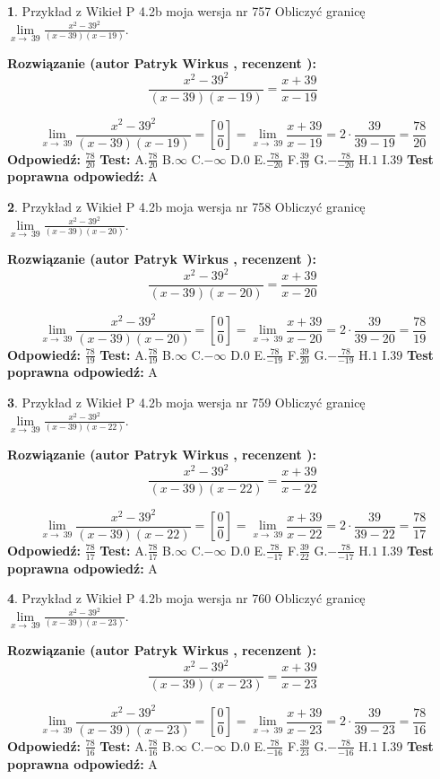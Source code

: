 \documentclass[12pt, a4paper]{article}
\theoremstyle{definition} %
\newtheorem{zad}{}
\newcommand{\zadStart}[1]{\begin{zad}#1\newline}
\newcommand{\zadStop}{\end{zad}}
\newcommand{\rozwStart}[2]{\noindent \textbf{Rozwiązanie (autor #1 , recenzent #2): }\newline}
\newcommand{\rozwStop}{\newline}
\newcommand{\odpStart}{\noindent \textbf{Odpowiedź:}\newline}
\newcommand{\odpStop}{\newline}
\newcommand{\testStart}{\noindent \textbf{Test:}\newline}
\newcommand{\testStop}{\newline}
\newcommand{\kluczStart}{\noindent \textbf{Test poprawna odpowiedź:}\newline}
\newcommand{\kluczStop}{\newline}
\begin{document}
\zadStart{Przykład z Wikieł P 4.2b moja wersja nr 757}
Obliczyć granicę $\lim\limits_{x\to\ 39}\frac{x^{2}-39^{2}}{(x-39)(x-19)}$.
\zadStop
\rozwStart{Patryk Wirkus}{}
$$\frac{x^{2}-39^{2}}{(x-39)(x-19)}=\frac{x+39}{x-19}$$

$$\lim\limits_{x\to\ 39}\frac{x^{2}-39^{2}}{(x-39)(x-19)}=[\frac{0}{0}]=\lim\limits_{x\to\ 39}\frac{x+39}{x-19}=2 \cdot \frac{39}{39-19} = \frac{78}{20}$$
\rozwStop
\odpStart
$\frac{78}{20}$
\odpStop
\testStart
A.$\frac{78}{20}$
B.$\infty$
C.$-\infty$
D.$0$
E.$\frac{78}{-20}$
F.$\frac{39}{19}$
G.$-\frac{78}{-20}$
H.$1$
I.$39$
\testStop
\kluczStart
A
\kluczStop



\zadStart{Przykład z Wikieł P 4.2b moja wersja nr 758}
Obliczyć granicę $\lim\limits_{x\to\ 39}\frac{x^{2}-39^{2}}{(x-39)(x-20)}$.
\zadStop
\rozwStart{Patryk Wirkus}{}
$$\frac{x^{2}-39^{2}}{(x-39)(x-20)}=\frac{x+39}{x-20}$$

$$\lim\limits_{x\to\ 39}\frac{x^{2}-39^{2}}{(x-39)(x-20)}=[\frac{0}{0}]=\lim\limits_{x\to\ 39}\frac{x+39}{x-20}=2 \cdot \frac{39}{39-20} = \frac{78}{19}$$
\rozwStop
\odpStart
$\frac{78}{19}$
\odpStop
\testStart
A.$\frac{78}{19}$
B.$\infty$
C.$-\infty$
D.$0$
E.$\frac{78}{-19}$
F.$\frac{39}{20}$
G.$-\frac{78}{-19}$
H.$1$
I.$39$
\testStop
\kluczStart
A
\kluczStop



\zadStart{Przykład z Wikieł P 4.2b moja wersja nr 759}
Obliczyć granicę $\lim\limits_{x\to\ 39}\frac{x^{2}-39^{2}}{(x-39)(x-22)}$.
\zadStop
\rozwStart{Patryk Wirkus}{}
$$\frac{x^{2}-39^{2}}{(x-39)(x-22)}=\frac{x+39}{x-22}$$

$$\lim\limits_{x\to\ 39}\frac{x^{2}-39^{2}}{(x-39)(x-22)}=[\frac{0}{0}]=\lim\limits_{x\to\ 39}\frac{x+39}{x-22}=2 \cdot \frac{39}{39-22} = \frac{78}{17}$$
\rozwStop
\odpStart
$\frac{78}{17}$
\odpStop
\testStart
A.$\frac{78}{17}$
B.$\infty$
C.$-\infty$
D.$0$
E.$\frac{78}{-17}$
F.$\frac{39}{22}$
G.$-\frac{78}{-17}$
H.$1$
I.$39$
\testStop
\kluczStart
A
\kluczStop



\zadStart{Przykład z Wikieł P 4.2b moja wersja nr 760}
Obliczyć granicę $\lim\limits_{x\to\ 39}\frac{x^{2}-39^{2}}{(x-39)(x-23)}$.
\zadStop
\rozwStart{Patryk Wirkus}{}
$$\frac{x^{2}-39^{2}}{(x-39)(x-23)}=\frac{x+39}{x-23}$$

$$\lim\limits_{x\to\ 39}\frac{x^{2}-39^{2}}{(x-39)(x-23)}=[\frac{0}{0}]=\lim\limits_{x\to\ 39}\frac{x+39}{x-23}=2 \cdot \frac{39}{39-23} = \frac{78}{16}$$
\rozwStop
\odpStart
$\frac{78}{16}$
\odpStop
\testStart
A.$\frac{78}{16}$
B.$\infty$
C.$-\infty$
D.$0$
E.$\frac{78}{-16}$
F.$\frac{39}{23}$
G.$-\frac{78}{-16}$
H.$1$
I.$39$
\testStop
\kluczStart
A
\kluczStop
\end{document}

